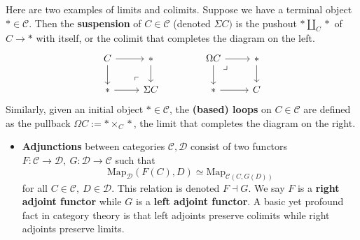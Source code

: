 \begin{example}
\begin{itemize}
    \end{itemize}
    Here are two examples of limits and colimits. Suppose we have a terminal object $* \in \mathcal{C} $. Then the \textbf{suspension} of $C \in \mathcal{C} $ (denoted $\Sigma C)$ is the pushout $* \amalg_C *$ of $C \to *$ with itself, or the colimit that completes the diagram on the left.
    \[
    \begin{tikzcd}
        C\arrow[r]\arrow[d] & *\arrow[d] \\
        *\arrow[r] & \Sigma C\arrow[ul,phantom,"\ulcorner", very near start]
    \end{tikzcd}\qquad\qquad
    \begin{tikzcd}
        \Omega C\arrow[d]\arrow[r] \arrow[dr,phantom,"\lrcorner",very near start]& *\arrow[d] \\
        *\arrow[r] &C
    \end{tikzcd}
\] 
Similarly, given an initial object $* \in \mathcal{C} $, the \textbf{(based) loops} on $C \in \mathcal{C} $ are defined as the pullback $\Omega C:= * \times_C  *$, the limit that completes the diagram on the right.
\begin{itemize}
\setlength\itemsep{-.2em}
    \item \textbf{Adjunctions} between categories $\mathcal{C} ,\mathcal{D} $ consist of two functors $F \colon \mathcal{C}  \to \mathcal{D} ,\ G \colon \mathcal{D}  \to \mathcal{C} $ such that \[
            \mathrm{Map}_{\mathcal{D} }(F(C),D)\simeq \mathrm{Map}_{\mathcal{C} (C, G(D))}
    \] for all $C \in \mathcal{C} ,\ D \in \mathcal{D} $. This relation is denoted $F\dashv G$. We say $F$ is a \textbf{right adjoint functor} while $G$ is a \textbf{left adjoint functor}. A basic yet profound fact in category theory is that left adjoints preserve colimits while right adjoints preserve limits.
\end{itemize}
\end{example}

